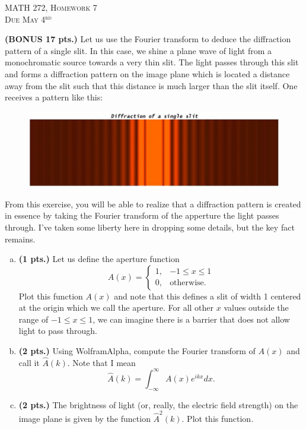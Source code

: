 \documentclass[12pt]{article} %
\begin{document}
\begin{center}
   \textsc{\large MATH 272, Homework 7}\\
   \textsc{Due May 4$^\textrm{rd}$}
\end{center}
\vspace{.5cm}


\begin{problem}
\textbf{(BONUS 17 pts.)} Let us use the Fourier transform to deduce the diffraction pattern of a single slit. In this case, we shine a plane wave of light from a monochromatic source towards a very thin slit. The light passes through this slit and forms a diffraction pattern on the image plane which is located a distance away from the slit such that this distance is much larger than the slit itself. One receives a pattern like this:
\begin{figure}[H]
    \centering
    \includegraphics[width=.6\textwidth]{single_slit.jpg}
\end{figure}
From this exercise, you will be able to realize that a diffraction pattern is created in essence by taking the Fourier transform of the apperture the light passes through. I've taken some liberty here in dropping some details, but the key fact remains.
\begin{enumerate}[(a)]
    \item \textbf{(1 pts.)} Let us define the aperture function
    \[
    A(x) = \begin{cases} 1, & -1 \leq x \leq 1\\
    0, &\textrm{otherwise}.
    \end{cases}
    \]
    Plot this function $A(x)$ and note that this defines a slit of width 1 centered at the origin which we call the aperture. For all other $x$ values outside the range of $-1 \leq x \leq 1$, we can imagine there is a barrier that does not allow light to pass through.
    \item \textbf{(2 pts.)} Using WolframAlpha, compute the Fourier transform of $A(x)$ and call it $\hat{A}(k)$. Note that I mean
	\[
	\hat{A}(k) = \int_{-\infty}^\infty A(x) e^{ikx}dx.
	\]
    \item \textbf{(2 pts.)} The brightness of light (or, really, the electric field strength) on the image plane is given by the function $\hat{A}^2(k)$. Plot this function. %

\end{enumerate}
\end{problem}
\end{document}
